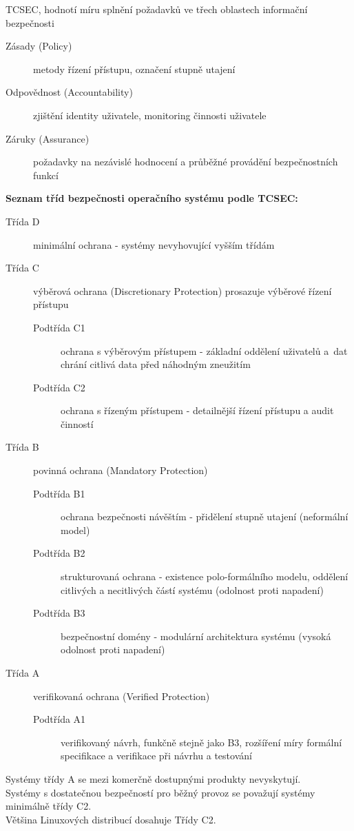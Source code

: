 \documentclass[a4paper,12pt]{article}
\renewcommand{\b}[1]{\textbf{#1}} %
\begin{document}
\vspace{4 mm}
TCSEC, hodnotí míru splnění požadavků ve třech oblastech informační bezpečnosti~\cite{PrezentaceBIS}
\begin{description}
 \item[Zásady (Policy)] metody řízení přístupu, označení stupně utajení
 \item[Odpovědnost (Accountability)] zjištění identity uživatele, monitoring činnosti uživatele
 \item[Záruky (Assurance)] požadavky na nezávislé hodnocení a průběžné provádění bezpečnostních funkcí
 \end{description}
\b{Seznam tříd bezpečnosti operačního systému podle TCSEC:}
\begin{description}
\item[Třída D] minimální ochrana - systémy nevyhovující vyšším třídám
\item[Třída C] výběrová ochrana (Discretionary Protection) prosazuje výběrové řízení přístupu
\begin{description}
\item[Podtřída C1] ochrana s výběrovým přístupem - základní oddělení uživatelů a~dat chrání citlivá data před náhodným zneužitím
\item[Podtřída C2] ochrana  s řízeným přístupem - detailnější řízení přístupu a audit činností
\end{description}
\item[Třída B] povinná ochrana (Mandatory Protection)
\begin{description}
\item[Podtřída B1] ochrana bezpečnosti návěštím - přidělení stupně utajení (neformální model)
\item[Podtřída B2] strukturovaná ochrana - existence polo-formálního modelu, oddělení citlivých a necitlivých částí systému (odolnost proti napadení)
\item[Podtřída B3] bezpečnostní domény - modulární architektura systému (vysoká odolnost proti napadení)
\end{description}
\item[Třída A] verifikovaná ochrana (Verified Protection)
\begin{description}
\item[Podtřída A1] verifikovaný návrh, funkčně stejně jako B3, rozšíření míry formální specifikace a verifikace při návrhu a testování 
\end{description}
\end{description}
Systémy třídy A se mezi komerčně dostupnými produkty nevyskytují.\\
Systémy s dostatečnou bezpečností pro běžný provoz se považují systémy minimálně třídy C2.~\cite{PrezentaceBIS}\\
Většina Linuxových distribucí dosahuje Třídy C2.~\cite{LinuxDictionary}
\end{document}
